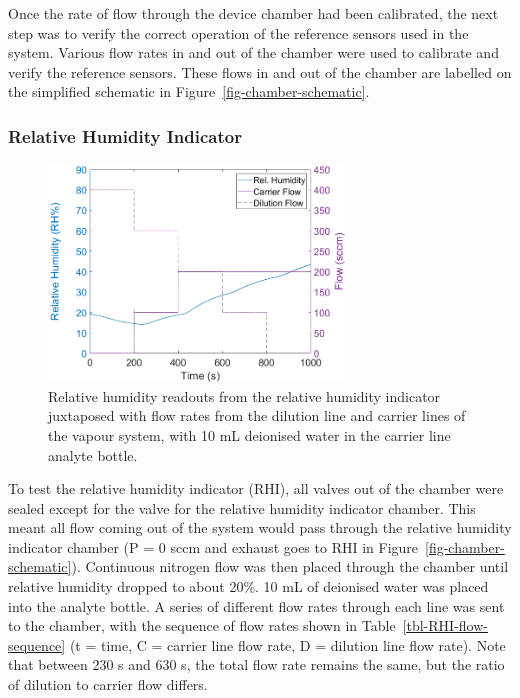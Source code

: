 \documentclass[
  a4paper,
]{scrbook}
\begin{document}
Once the rate of flow through the device chamber had been calibrated,
the next step was to verify the correct operation of the reference
sensors used in the system. Various flow rates in and out of the chamber
were used to calibrate and verify the reference sensors. These flows in
and out of the chamber are labelled on the simplified schematic in
Figure~\ref{fig-chamber-schematic}.

\hypertarget{relative-humidity-indicator}{%
\subsubsection*{Relative Humidity
Indicator}\label{relative-humidity-indicator}}

\begin{figure}

{\centering \includegraphics[width=0.7\textwidth,height=\textheight]{figures/ch5/RHI_verification.png}

}

\caption{\label{fig-RHI-verification}Relative humidity readouts from the
relative humidity indicator juxtaposed with flow rates from the dilution
line and carrier lines of the vapour system, with 10 mL deionised water
in the carrier line analyte bottle.}

\end{figure}

To test the relative humidity indicator (RHI), all valves out of the
chamber were sealed except for the valve for the relative humidity
indicator chamber. This meant all flow coming out of the system would
pass through the relative humidity indicator chamber (P = 0 sccm and
exhaust goes to RHI in Figure~\ref{fig-chamber-schematic}). Continuous
nitrogen flow was then placed through the chamber until relative
humidity dropped to about 20\%. 10 mL of deionised water was placed into
the analyte bottle. A series of different flow rates through each line
was sent to the chamber, with the sequence of flow rates shown in
Table~\ref{tbl-RHI-flow-sequence} (t = time, C = carrier line flow rate,
D = dilution line flow rate). Note that between 230 s and 630 s, the
total flow rate remains the same, but the ratio of dilution to carrier
flow differs.
\end{document}
